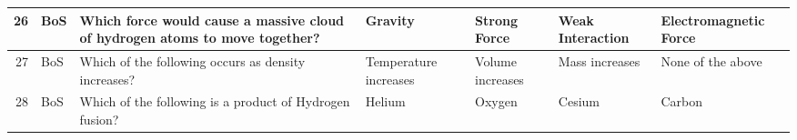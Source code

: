 \documentclass[10pt]{article}
\begin{document}
\begin{tiny}
\begin{longtable}{|r|p{0.375in}|p{1.275in}|p{0.75in}|p{0.75in}|p{0.75in}|p{0.75in}|}
    26    &     BoS &                                                                                                                                                                                                      Which force would cause a massive cloud of hydrogen atoms to move together? &                                                                                                                               Gravity &                                                                                          Strong Force &                                                                                                           Weak Interaction &                                                                                                             Electromagnetic Force \\\hline
    27    &     BoS &                                                                                                                                                                                                                              Which of the following occurs as density increases? &                                                                                                                 Temperature increases &                                                                                      Volume increases &                                                                                                             Mass increases &                                                                                                                 None of the above \\\hline
    28    &     BoS &                                                                                                                                                                                                                          Which of the following is a product of Hydrogen fusion? &                                                                                                                                Helium &                                                                                                Oxygen &                                                                                                                     Cesium &                                                                                                                            Carbon \\\hline

\end{longtable}
\end{tiny}
\end{document}
